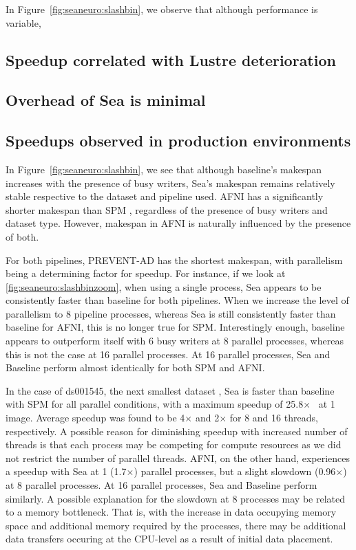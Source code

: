In Figure~\ref{fig:seaneuro:slashbin}, we observe that although performance is variable, 

\subsection{Speedup correlated with Lustre deterioration}

\subsection{Overhead of Sea is minimal}

\subsection{Speedups observed in production environments}

In Figure~\ref{fig:seaneuro:slashbin}, we see that although baseline's makespan increases with the presence of busy writers,
Sea's makespan remains relatively stable respective to the dataset and pipeline used. AFNI has a significantly shorter makespan
than SPM , regardless of the presence of busy writers and dataset type. However, makespan in AFNI is naturally influenced by the presence of both.

For both  pipelines, PREVENT-AD has the shortest makespan, with parallelism being a determining factor for speedup. For instance, if we look
at \ref{fig:seaneuro:slashbinzoom}, when using a single process, Sea appears to be consistently faster than baseline for both pipelines.
When we increase the level of parallelism to 8 pipeline processes, whereas Sea is still consistently faster than baseline for AFNI, this
is no longer true for SPM. Interestingly enough, baseline appears to outperform itself with 6 busy writers at 8 parallel processes, whereas
this is not the case at 16 parallel processes. At 16 parallel processes, Sea and Baseline perform almost identically for both SPM and AFNI.

In the case of ds001545, the next smallest dataset , Sea is faster than baseline with SPM for all parallel conditions, with a maximum speedup of 25.8$\times$~ at 1 image.
Average speedup was found to be 4$\times$ and 2$\times$ for 8 and 16 threads, respectively. A possible reason for diminishing speedup with increased number of 
threads is that each process may be competing for compute resources as we did not restrict the number of parallel threads.
AFNI, on the other hand, experiences a speedup with Sea at 1 (1.7$\times$) parallel processes, but a slight slowdown (0.96$\times$) at 8 parallel processes.
At 16 parallel processes, Sea and Baseline perform similarly. A possible explanation for the slowdown at 8 processes may be related to a memory bottleneck. That is, with the increase in data occupying memory space and additional memory required by the processes, there may be additional data transfers occuring at the CPU-level as a result of initial data placement.

